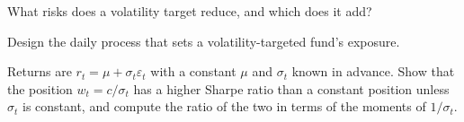 \begin{interviewq}\label{iq:s1:volatility-targeting-and-risk-managed-portfolios:4}
What risks does a volatility target reduce, and which does it add?
\end{interviewq}

\begin{interviewq}\label{iq:s1:volatility-targeting-and-risk-managed-portfolios:5}
Design the daily process that sets a volatility-targeted fund's exposure.
\end{interviewq}

\begin{interviewq}\label{iq:s1:volatility-targeting-and-risk-managed-portfolios:6}
Returns are $r_t = \mu + \sigma_t\varepsilon_t$ with a constant $\mu$ and $\sigma_t$ known in advance. Show that the position $w_t = c/\sigma_t$ has a
higher Sharpe ratio than a constant position unless $\sigma_t$ is constant, and compute the ratio of the two in terms of the moments of $1/\sigma_t$.
\end{interviewq}
